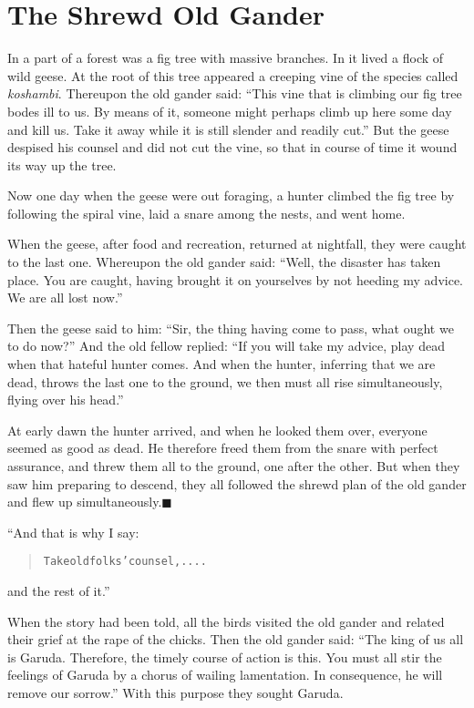 \documentclass[article, twoside, 14pt]{memoir}
\newcommand{\qed}{\hfill \ensuremath{\blacksquare}}
\renewenvironment{verbatim}{%
\begin{quote}%
\vskip -10pt%
\begin{alltt}\normalfont\large}{\end{alltt}%
\end{quote}%
\vskip -10pt
} %
\begin{document}
\chapter{The Shrewd Old Gander}

\label{s22}

In a part of a forest was a fig tree with massive branches. In it
lived a flock of wild geese. At the root of this tree appeared a
creeping vine of the species called \emph{koshambi}. Thereupon the
old gander said:
``This vine that is climbing our fig tree bodes ill to us. By means of it, someone might perhaps climb up here some day and kill us. Take it away while it is still slender and readily cut.''
But the geese despised his counsel and did not cut the vine, so
that in course of time it wound its way up the tree.

Now one day when the geese were out foraging, a hunter climbed the
fig tree by following the spiral vine, laid a snare among the
nests, and went home.

When the geese, after food and recreation, returned at nightfall,
they were caught to the last one. Whereupon the old gander said:
``Well, the disaster has taken place. You are caught, having brought it on yourselves by not heeding my advice. We are all lost now.''

Then the geese said to him:
``Sir, the thing having come to pass, what ought we to do now?''
And the old fellow replied:
``If you will take my advice, play dead when that hateful hunter comes. And when the hunter, inferring that we are dead, throws the last one to the ground, we then must all rise simultaneously, flying over his head.''

At early dawn the hunter arrived, and when he looked them over,
everyone seemed as good as dead. He therefore freed them from the
snare with perfect assurance, and threw them all to the ground, one
after the other. But when they saw him preparing to descend, they
all followed the shrewd plan of the old gander and flew up
simultaneously.\hyperref[s22]{\qed}

“And that is why I say:

\begin{verbatim}
Take old folks' counsel, ....
\end{verbatim}
and the rest of it.”

When the story had been told, all the birds visited the old gander
and related their grief at the rape of the chicks. Then the old
gander said:
``The king of us all is Garuda. Therefore, the timely course of action is this. You must all stir the feelings of Garuda by a chorus of wailing lamentation. In consequence, he will remove our sorrow.''
With this purpose they sought Garuda.
\end{document}
